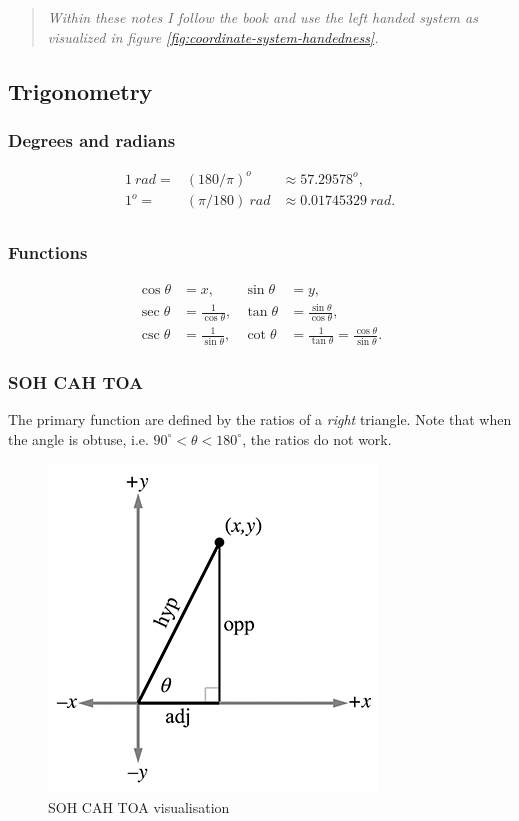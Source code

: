 \documentclass[11pt]{article}
\begin{document}
\begin{quote}
\emph{Within these notes I follow the book and use the left handed system as visualized in figure \ref{fig:coordinate-system-handedness}.}
\end{quote}

\subsection{Trigonometry}

\subsubsection{Degrees and radians}

\[
\begin{array}{rll}
{1\ {rad} =} & {\left( 180/\pi \right)^{o}} & {\approx 57.29578^{o},} \\
{1^{o} =} & {\left( \pi/180 \right)\ {rad}} & {\approx 0.01745329\ {rad}.} \\
\end{array}
\]


\subsubsection{Functions}

\begin{align*}
\cos\theta &=x, &\sin\theta &=y, \\
\sec\theta &=\frac{1}{\cos\theta}, &\tan\theta &=\frac{\sin\theta}{\cos\theta}, \\
\csc\theta &=\frac{1}{\sin\theta}, &\cot\theta &=\frac{1}{\tan\theta}=\frac{\cos\theta}{\sin\theta}.
\end{align*}

\subsubsection{SOH CAH TOA}

The primary function are defined by the ratios of a \emph{right} triangle. Note that when the angle is obtuse, i.e. $90^\circ < \theta < 180^\circ$, the ratios do not work.

\begin{figure}[H]
\centering
    \includegraphics{01_sohcahtoa}
\caption{SOH CAH TOA visualisation}
\label{fig:soh-cah-toa-visualization}
\end{figure}
\end{document}

